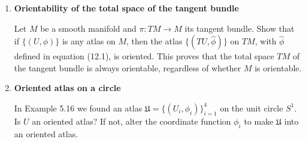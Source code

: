 \documentclass[12pt,a4paper]{report}
\begin{document}
\begin{enumerate}[label=21.\arabic*]
Show that the parallelizable manifold is orientable.  (In particular, this shows again that every Lie group is orientable.)

\item \textbf{Orientability of the total space of the tangent bundle}

Let $M$ be a smooth manifold and $\pi:TM\to M$ its tangent bundle.  Show that if $\{(U,\phi)\}$ is any atlas on $M$, then the atlas $\{(TU,\hat{\phi})\}$ on $TM$, with $\hat{\phi}$ defined in equation (12.1), is oriented.  This proves that the total space $TM$ of the tangent bundle is always orientable, regardless of whether $M$ is orientable.

\item \textbf{Oriented atlas on a circle}

In Example 5.16 we found an atlas $\mathfrak{U}=\{(U_i,\phi_i)\}_{i=1}^4$ on the unit circle $S^1$.  Is ${U}$ an oriented atlas?  If not, alter the coordinate function $\phi_i$ to make $\mathfrak{U}$ into an oriented atlas.


\end{enumerate}
\end{document}

